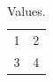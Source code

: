 \documentclass{article}
\begin{document}
\begin{table}\caption{Values.}\label{tab:a}\begin{tabular}{cc}1&2\\3&4\end{tabular}\end{table}
\end{document}
